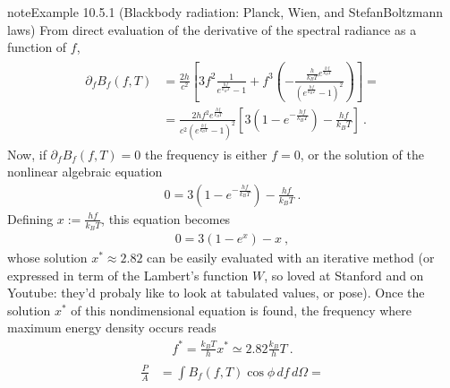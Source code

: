 \documentclass[letterpaper,10pt,english]{jupyterBook}
\begin{document}
\begin{sphinxadmonition}{note}{Example 10.5.1 (Black\sphinxhyphen{}body radiation: Planck, Wien, and Stefan\sphinxhyphen{}Boltzmann laws)}
\sphinxAtStartPar
From direct evaluation of the derivative of the spectral radiance as a function of \(f\),
\begin{equation*}
\begin{split}\begin{aligned}
  \partial_f B_{f}(f,T)
  & = \frac{2 h}{c^2} \left[ 3 f^2 \frac{1}{e^{\frac{hf}{k_B T}}-1} + f^3 \left(-\frac{\frac{h}{k_B T} e^{\frac{hf}{k_B T}}}{\left( e^{\frac{hf}{k_B T}} - 1 \right)^2}  \right) \right] = \\
  & = \frac{2 h f^2 e^{\frac{hf}{k_B T}}}{c^2 \left( e^{\frac{hf}{k_B T}} - 1 \right)^2} \left[ 3 \left( 1 - e^{-\frac{hf}{k_B T}} \right) - \frac{h f}{k_B T}  \right] \ .
\end{aligned}\end{split}
\end{equation*}
\sphinxAtStartPar
Now, if \(\partial_f B_{f}(f,T) = 0\) the frequency is either \(f = 0\), or the solution of the nonlinear algebraic equation
\begin{equation*}
\begin{split}0 = 3 \left(1 - e^{-\frac{h f}{k_B T}} \right) - \frac{hf}{k_B T} \ .\end{split}
\end{equation*}
\sphinxAtStartPar
Defining \(x := \frac{h f}{k_B T}\), this equation becomes
\begin{equation*}
\begin{split}0 = 3 (1 - e^x) - x \ ,\end{split}
\end{equation*}
\sphinxAtStartPar
whose solution \(x^* \approx 2.82\) can be easily evaluated with an iterative method (or expressed in term of the Lambert’s function \(W\), so loved at Stanford and on Youtube: they’d probaly like to look at tabulated values, or pose). Once the solution \(x^*\) of this non\sphinxhyphen{}dimensional equation is found, the frequency where maximum energy density occurs reads
\begin{equation*}
\begin{split}f^* = \frac{k_B T}{h} x^* \simeq 2.82 \frac{k_B}{h} T \ .\end{split}
\end{equation*}
\sphinxAtStartPar
{}
\begin{equation*}
\begin{split}\begin{aligned}
  \frac{P}{A} 
  & = \int B_{f}(f,T) \cos \phi \, df \, d\Omega = \\

\end{aligned}
\end{split}
\end{equation*}
\end{sphinxadmonition}
\end{document}
